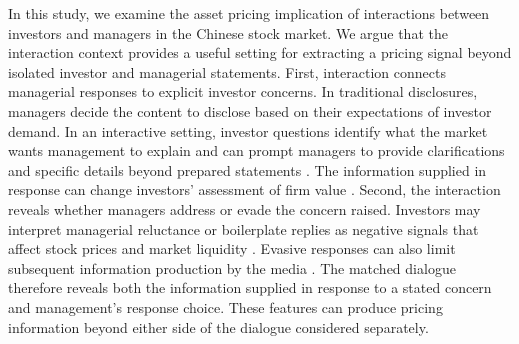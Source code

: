 \documentclass[12pt]{article}
\begin{document}
In this study, we examine the asset pricing implication of interactions between investors and managers in the Chinese stock market. We argue that the interaction context provides a useful setting for extracting a pricing signal beyond isolated investor and managerial statements. First, interaction connects managerial responses to explicit investor concerns. In traditional disclosures, managers decide the content to disclose based on their expectations of investor demand. In an interactive setting, investor questions identify what the market wants management to explain and can prompt managers to provide clarifications and specific details beyond prepared statements \citep{hollander2010,matsumoto2011}. The information supplied in response can change investors' assessment of firm value \citep{matsumoto2011}. Second, the interaction reveals whether managers address or evade the concern raised. Investors may interpret managerial reluctance or boilerplate replies as negative signals that affect stock prices and market liquidity \citep{hollander2010,xie2023}. Evasive responses can also limit subsequent information production by the media \citep{boustanifar2025}. The matched dialogue therefore reveals both the information supplied in response to a stated concern and management's response choice. These features can produce pricing information beyond either side of the dialogue considered separately.
\end{document}
